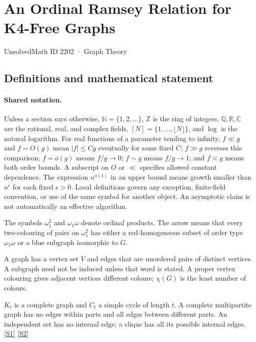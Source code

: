 \documentclass[11pt,a4paper]{article}
\newcommand{\N}{\mathbb{N}}
\newcommand{\Z}{\mathbb{Z}}
\newcommand{\Q}{\mathbb{Q}}
\newcommand{\R}{\mathbb{R}}
\newcommand{\C}{\mathbb{C}}
\newcommand{\sref}[2]{\hyperlink{source:#1:#2}{[S#2]}}
\begin{document}

\setcounter{section}{2201}

\section{An Ordinal Ramsey Relation for K4-Free Graphs}\label{2202}

{\small\sffamily UnsolvedMath ID 2202 · Graph Theory}

\subsection{Definitions and mathematical statement}

\paragraph{Shared notation.}Unless a section says otherwise, $\N=\{1,2,\ldots\}$,
$\Z$ is the ring of integers, $\Q,\R,\C$ are the rational, real, and complex
fields, $[N]=\{1,\ldots,\lfloor N\rfloor\}$, and $\log$ is the natural
logarithm. For real functions of a parameter tending to infinity,
$f\ll g$ and $f=O(g)$ mean $|f|\leq Cg$ eventually for some fixed $C$;
$f\gg g$ reverses this comparison; $f=o(g)$ means $f/g\to0$;
$f\sim g$ means $f/g\to1$; and $f\asymp g$ means both order bounds.
A subscript on $O$ or $\ll$ specifies allowed constant dependence.
The expression $n^{o(1)}$ in an upper bound means growth smaller than
$n^\epsilon$ for each fixed $\epsilon>0$. Local definitions govern any
exception, finite-field convention, or use of the same symbol for another
object. An asymptotic claim is not automatically an effective algorithm.



The symbols $\omega_1^2$ and $\omega_1\omega$ denote ordinal products. The arrow means that every two-colouring of pairs on $\omega_1^2$ has either a red-homogeneous subset of order type $\omega_1\omega$ or a blue subgraph isomorphic to $G$.

A graph has a vertex set $V$ and edges that are unordered pairs of distinct vertices. A subgraph need not be induced unless that word is stated. A proper vertex colouring gives adjacent vertices different colours; $\chi(G)$ is the least number of colours.

$K_t$ is a complete graph and $C_t$ a simple cycle of length $t$. A complete multipartite graph has no edges within parts and all edges between different parts. An independent set has no internal edge; a clique has all its possible internal edges. \sref{2202}{1} \sref{2202}{2}
\end{document}
